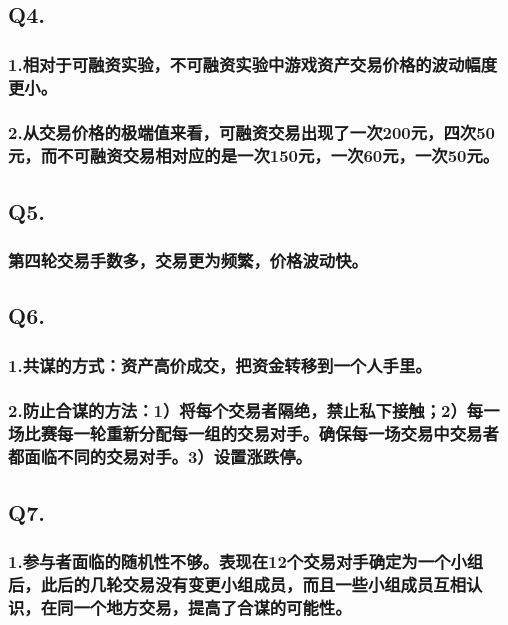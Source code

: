 \documentclass[]{article}
\title{}
\author{}
\date{}
\begin{document}
\subsection{Q4.}\label{q4.}

\subsubsection{1.相对于可融资实验，不可融资实验中游戏资产交易价格的波动幅度更小。}

\subsubsection{2.从交易价格的极端值来看，可融资交易出现了一次200元，四次50元，而不可融资交易相对应的是一次150元，一次60元，一次50元。}\label{200501506050}

\subsection{Q5.}\label{q5.}

\subsubsection{第四轮交易手数多，交易更为频繁，价格波动快。}

\subsection{Q6.}\label{q6.}

\subsubsection{1.共谋的方式：资产高价成交，把资金转移到一个人手里。}

\subsubsection{2.防止合谋的方法：1）将每个交易者隔绝，禁止私下接触；2）每一场比赛每一轮重新分配每一组的交易对手。确保每一场交易中交易者都面临不同的交易对手。3）设置涨跌停。}\label{123}

\subsection{Q7.}\label{q7.}

\subsubsection{1.参与者面临的随机性不够。表现在12个交易对手确定为一个小组后，此后的几轮交易没有变更小组成员，而且一些小组成员互相认识，在同一个地方交易，提高了合谋的可能性。}\label{12}
\end{document}

